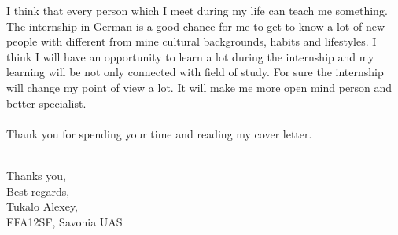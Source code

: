 \documentclass[english]{article}
\begin{document}
I think that every person which I meet during my life can teach me something. The internship in German is a good chance for me to get to know a lot of new people with different from mine cultural backgrounds, habits and lifestyles. I think I will have an opportunity to learn a lot during the internship and my learning will be not only connected with field of study. For sure the internship will change my point of view a lot. It will make me more open mind person and better specialist.\\\\
Thank you for spending your time and reading my cover letter.\\\\


\begin{flushright}

Thanks you,\\
Best regards, \\
Tukalo Alexey,\\
EFA12SF, Savonia UAS\\
     

\end{flushright}
\end{document}
